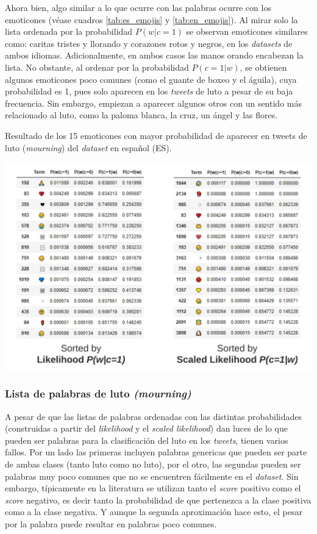 Ahora bien, algo similar a lo que ocurre con las palabras ocurre con los emoticones (véase cuadros \ref{tab:es_emojis} y \ref{tab:en_emojis}). Al mirar solo la lista ordenada por la probabilidad $P(w|c=1)$ se observan emoticones similares como: caritas tristes y llorando y corazones rotos y negros, en los \textit{datasets} de ambos idiomas. Adicionalmente, en ambos casos las manos orando encabezan la lista. No obstante, al ordenar por la probabilidad $P(c=1|w)$, se obtienen algunos emoticones poco comunes (como el guante de boxeo y el águila), cuya probabilidad es 1, pues solo aparecen en los \textit{tweets} de luto a pesar de su baja frecuencia. Sin embargo, empiezan a aparecer algunos otros con un sentido más relacionado al luto, como la paloma blanca, la cruz, un ángel y las flores. 

\begin{table}[H]
    \centering
    \caption{Resultado de los 15 emoticones con mayor probabilidad de aparecer en tweets de luto (\textit{mourning}) del \textit{dataset} en español (ES).}
    \label{tab:en_emojis}
    \includegraphics[width=\textwidth]{doc/images/EN_Emojis.png}
\end{table}

\subsubsection{Lista de palabras de luto \textit{(mourning)}}

A pesar de que las listas de palabras ordenadas con las distintas probabilidades (construidas a partir del \textit{likelihood} y el \textit{scaled likelihood}) dan luces de lo que pueden ser palabras para la clasificación del luto en los \textit{tweets}, tienen varios fallos. Por un lado las primeras incluyen palabras genericas que pueden ser parte de ambas clases (tanto luto como no luto), por el otro, las segundas pueden ser palabras muy poco comunes que no se encuentren fácilmente en el \textit{dataset}. Sin embargo, típicamente en la literatura se utilizan tanto el \textit{score} positivo como el \textit{score} negativo, es decir tanto la probabilidad de que pertenezca a la clase positiva como a la clase negativa. Y aunque la segunda aproximación hace esto, el pesar por la palabra puede resultar en palabras poco comunes. \\

